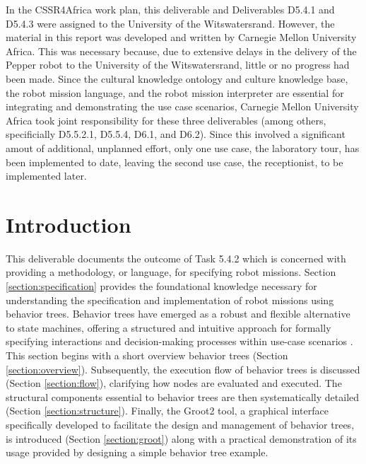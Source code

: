 \documentclass{CSSRforAfrica}
\begin{document}

In the CSSR4Africa work plan, this deliverable  and Deliverables D5.4.1 and D5.4.3 were  assigned to the University of the Witswatersrand. However, the material in this  report was developed and written by Carnegie Mellon University Africa. This was necessary because, due to extensive delays in the delivery of the Pepper robot to the University of the Witswatersrand, little or no progress had been made. Since the cultural knowledge ontology and culture knowledge base, the robot mission language, and the robot mission interpreter are essential for integrating and demonstrating the use case scenarios,  Carnegie Mellon University Africa took joint responsibility for these three deliverables (among others, specificially D5.5.2.1, D5.5.4,  D6.1, and D6.2). Since this involved a significant amout of additional, unplanned effort, only one use case, the laboratory tour,  has been implemented to date, leaving the second use case, the receptionist, to be implemented later.


\pagebreak
\tableofcontents
\newpage


\section{Introduction}
 \label{section:introduction}


This deliverable documents the outcome of Task 5.4.2 which is concerned with providing a methodology, or language, for specifying robot missions. Section \ref{section:specification} provides the foundational knowledge necessary for understanding the specification and implementation of robot missions using behavior trees. Behavior trees have emerged as a robust and flexible alternative to state machines, offering a structured and intuitive approach for formally specifying interactions and decision-making processes within use-case scenarios \cite{Ghzoulietal2023}. This section begins with 
a short overview behavior trees (Section \ref{section:overview}). Subsequently, the execution flow of behavior trees is discussed (Section \ref{section:flow}), clarifying how nodes are evaluated and executed. The structural components essential to behavior trees are then systematically detailed (Section \ref{section:structure}). Finally, the Groot2 tool, a graphical interface specifically developed to facilitate the design and management of behavior trees, is introduced (Section \ref{section:groot}) along with a practical demonstration of its usage provided by designing a simple behavior tree example. 
\end{document}

